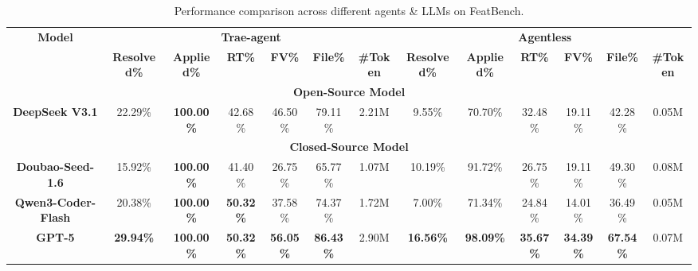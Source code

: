 \begin{table}[t!]
    \centering
    \caption{Performance comparison across different agents \& LLMs on
    FeatBench. }
    \begin{adjustbox}
        {width=\textwidth}
        \setlength{\tabcolsep}{3pt}
        \begin{tabular}{ccccccc|cccccc}
            \toprule \multirow{2}{*}{\textbf{Model}}                                 & \multicolumn{6}{c}{\textbf{Trae-agent}} & \multicolumn{6}{c}{\textbf{Agentless}} \\
            \cmidrule{2-13}                                                          & \textbf{Resolved\%}                     & \textbf{Applied\%}                    & \textbf{RT\%}    & \textbf{FV\%}    & \textbf{File\%}  & \textbf{\#Token} & \textbf{Resolved\%} & \textbf{Applied\%} & \textbf{RT\%}    & \textbf{FV\%}    & \textbf{File\%}  & \textbf{\#Token} \\
            \midrule \multicolumn{13}{c}{\cellcolor{lb} \textbf{Open-Source Model}}   \\
            \textbf{DeepSeek V3.1}                                                   & 22.29\%                                 & \textbf{100.00\%}                     & 42.68\%          & 46.50\%          & 79.11\%          & 2.21M            & 9.55\%              & 70.70\%            & 32.48\%          & 19.11\%          & 42.28\%          & 0.05M            \\
            \midrule \multicolumn{13}{c}{\cellcolor{lb} \textbf{Closed-Source Model}} \\
            \midrule \textbf{Doubao-Seed-1.6}                                        & 15.92\%                                 & \textbf{100.00\%}                     & 41.40\%          & 26.75\%          & 65.77\%          & 1.07M            & 10.19\%             & 91.72\%            & 26.75\%          & 19.11\%          & 49.30\%          & 0.08M            \\
            \textbf{Qwen3-Coder-Flash}                                               & 20.38\%                                 & \textbf{100.00\%}                     & \textbf{50.32\%} & 37.58\%          & 74.37\%          & 1.72M            & 7.00\%              & 71.34\%            & 24.84\%          & 14.01\%          & 36.49\%          & 0.05M            \\
            \textbf{GPT-5}                                                           & \textbf{29.94\%}                        & \textbf{100.00\%}                     & \textbf{50.32\%} & \textbf{56.05\%} & \textbf{86.43\%} & 2.90M            & \textbf{16.56\%}    & \textbf{98.09\%}   & \textbf{35.67\%} & \textbf{34.39\%} & \textbf{67.54\%} & 0.07M            \\

\end{tabular}
\end{adjustbox}
\end{table}
